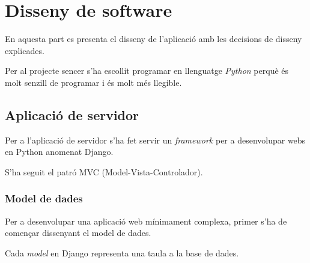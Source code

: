 \chapter{Disseny de software}\label{chapter:disseny de software}

En aquesta part es presenta el disseny de l'aplicació amb les decisions de disseny explicades.

Per al projecte sencer s'ha escollit programar en llenguatge \emph{Python} perquè és molt senzill de programar i és molt més llegible.

\section{Aplicació de servidor}
Per a l'aplicació de servidor s'ha fet servir un \textit{framework} per a desenvolupar webs en Python anomenat Django\autocite{django-tutorial}.

S'ha seguit el patró MVC (Model-Vista-Controlador).

\subsection{Model de dades}
Per a desenvolupar una aplicació web mínimament complexa, primer s'ha de començar dissenyant el model de dades.

Cada \textit{model} en Django representa una taula a la base de dades.

